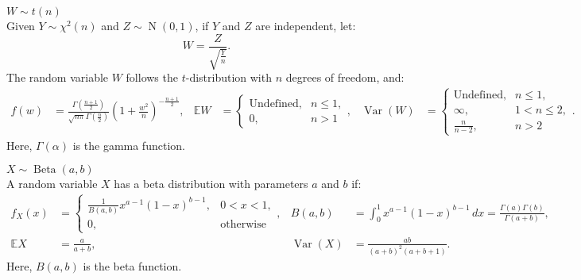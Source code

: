 \documentclass{huhtakm-template-book-v2}
\newcommand{\expect}{\mathbb{E}}
\DeclareMathOperator{\N}{N}
\DeclareMathOperator{\Beta}{Beta}
\DeclareMathOperator{\Var}{Var}
\begin{document}
    \begin{seg} $W \sim t(n)$\\
        Given $Y \sim \chi^{2}(n)$ and $Z \sim \N(0,1)$, if $Y$ and $Z$ are independent, let:
        \begin{equation*}
            W = \frac{Z}{\sqrt{\frac{Y}{n}}}.
        \end{equation*}
        The random variable $W$ follows the $t$-distribution with $n$ degrees of freedom, and:
        \begin{align*}
            f(w) &= \frac{\Gamma\left(\frac{n+1}{2}\right)}{\sqrt{n\pi}\Gamma\left(\frac{n}{2}\right)}\left(1+\frac{w^{2}}{n}\right)^{-\frac{n+1}{2}}, & \expect{W} &= \begin{cases}
                \text{Undefined}, &n \leq 1,\\
                0, &n > 1
            \end{cases}, & \Var(W) &= \begin{cases}
                \text{Undefined}, &n \leq 1,\\
                \infty, &1 < n \leq 2,\\
                \frac{n}{n-2}, &n > 2
            \end{cases}.
        \end{align*}
        Here, $\Gamma(\alpha)$ is the gamma function.
    \end{seg}
    \begin{seg} $X \sim \Beta(a, b)$\\
        A random variable $X$ has a beta distribution with parameters $a$ and $b$ if:
        \begin{align*}
            f_{X}(x) &= \begin{cases}
                \frac{1}{B(a, b)}x^{a-1}(1-x)^{b-1}, &0 < x < 1,\\
                0, &\text{otherwise}
            \end{cases}, & B(a, b) &= \int_{0}^{1}x^{a-1}(1-x)^{b-1}\,dx = \frac{\Gamma(a)\Gamma(b)}{\Gamma(a+b)},\\
            \expect{X} &= \frac{a}{a+b}, & \Var(X) &= \frac{ab}{(a+b)^{2}(a+b+1)}.
        \end{align*}
        Here, $B(a, b)$ is the beta function.
    \end{seg}
\end{document}
